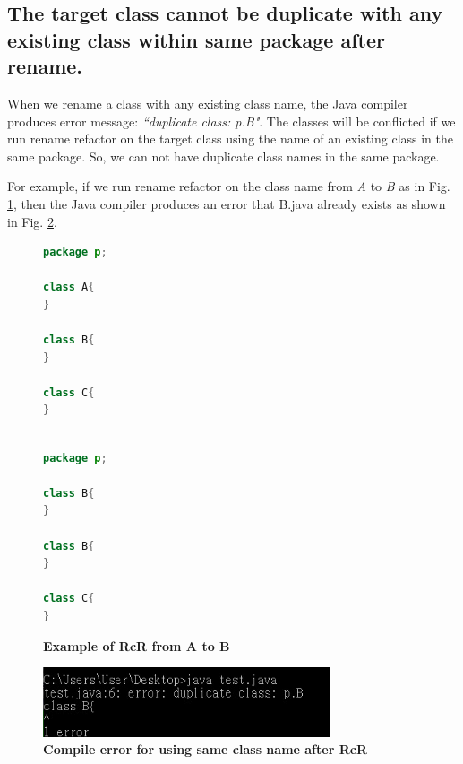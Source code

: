 \subsection{The target class cannot be duplicate with any existing class within same package after rename.}

When we rename a class with any existing class name, the Java compiler produces error message: \textit{``duplicate class: p.B"}. The classes will be conflicted if we run rename refactor on the target class using the name of an existing class in the same package. So, we can not have duplicate class names in the same package. 

For example, if we run rename refactor on the class name from \textsl{A} to \textsl{B} as in Fig. \ref{fig:afterrr}, then the Java compiler produces an error that B.java already exists as shown in Fig. \ref{fig:renameclassname}.

\begin{figure}[th]
\centering
\begin{minipage}[t]{0.45\linewidth}
\begin{lstlisting}[language=java, basicstyle=\scriptsize\ttfamily,frame=single]
package p;

class A{
}
	
class B{
}

class C{
}
 
\end{lstlisting}
\end{minipage}
\hfill
\begin{minipage}[t]{0.45\linewidth}
\begin{lstlisting}[language=java, basicstyle=\scriptsize\ttfamily,frame=single]
package p;

class B{
}	

class B{
}

class C{
}

\end{lstlisting}
\end{minipage}
\caption{\textbf{Example of RcR from A to B}}
\label{fig:afterrr}
\end{figure}

\begin{figure}[H]
\centerline{\includegraphics[width=85mm,scale=0.5]{SCN.jpg}}
\caption{\textbf{Compile error for using same class name after RcR}}
\label{fig:renameclassname}
\end{figure}

